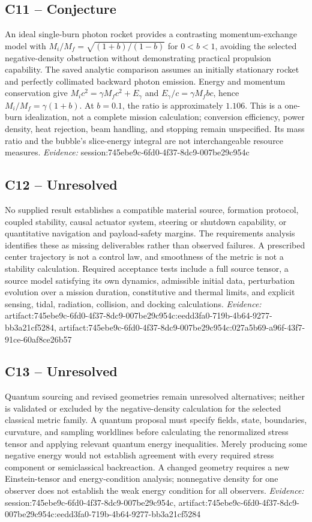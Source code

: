 \documentclass[11pt]{article}
\begin{document}
\subsection{C11 -- Conjecture}
An ideal single-burn photon rocket provides a contrasting momentum-exchange model with $M_i/M_f=\sqrt{(1+b)/(1-b)}$ for $0<b<1$, avoiding the selected negative-density obstruction without demonstrating practical propulsion capability.
The saved analytic comparison assumes an initially stationary rocket and perfectly collimated backward photon emission. Energy and momentum conservation give $M_ic^2=\gamma M_fc^2+E_\gamma$ and $E_\gamma/c=\gamma M_fbc$, hence $M_i/M_f=\gamma(1+b)$. At $b=0.1$, the ratio is approximately $1.106$. This is a one-burn idealization, not a complete mission calculation; conversion efficiency, power density, heat rejection, beam handling, and stopping remain unspecified. Its mass ratio and the bubble's slice-energy integral are not interchangeable resource measures.
\textit{Evidence: }session:745ebe9c-6fd0-4f37-8dc9-007be29c954c
\subsection{C12 -- Unresolved}
No supplied result establishes a compatible material source, formation protocol, coupled stability, causal actuator system, steering or shutdown capability, or quantitative navigation and payload-safety margins.
The requirements analysis identifies these as missing deliverables rather than observed failures. A prescribed center trajectory is not a control law, and smoothness of the metric is not a stability calculation. Required acceptance tests include a full source tensor, a source model satisfying its own dynamics, admissible initial data, perturbation evolution over a mission duration, constitutive and thermal limits, and explicit sensing, tidal, radiation, collision, and docking calculations.
\textit{Evidence: }artifact:745ebe9c-6fd0-4f37-8dc9-007be29c954c:eedd3fa0-719b-4b64-9277-bb3a21cf5284, artifact:745ebe9c-6fd0-4f37-8dc9-007be29c954c:027a5b69-a96f-43f7-91ce-60af8ce26b57
\subsection{C13 -- Unresolved}
Quantum sourcing and revised geometries remain unresolved alternatives; neither is validated or excluded by the negative-density calculation for the selected classical metric family.
A quantum proposal must specify fields, state, boundaries, curvature, and sampling worldlines before calculating the renormalized stress tensor and applying relevant quantum energy inequalities. Merely producing some negative energy would not establish agreement with every required stress component or semiclassical backreaction. A changed geometry requires a new Einstein-tensor and energy-condition analysis; nonnegative density for one observer does not establish the weak energy condition for all observers.
\textit{Evidence: }session:745ebe9c-6fd0-4f37-8dc9-007be29c954c, artifact:745ebe9c-6fd0-4f37-8dc9-007be29c954c:eedd3fa0-719b-4b64-9277-bb3a21cf5284
\end{document}
